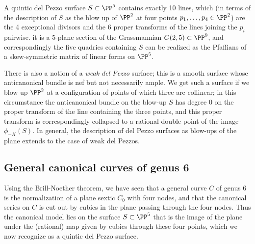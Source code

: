 \begin{fact}
A quintic del Pezzo surface $S \subset \PP^5$ contains exactly 10 lines, which (in terms of the description of $S$ as the blow up of $\PP^2$ at four points $p_1,\dots,p_4 \in \PP^2$) are the 4 exceptional divisors and the 6 proper transforms of the lines joining the $p_i$ pairwise. 
 it is a 5-plane section of the Grassmannian $G(2,5) \subset \PP^9$, and correspondingly the five quadrics containing $S$ can be realized as the Pfaffians of a  skew-symmetric matrix of linear forms on $\PP^5$. 
 



There is also a notion of a \emph{weak del Pezzo} surface; this is a smooth surface whose anticanonical bundle is nef but not necessarily ample. We get such a surface if we blow up $\PP^2$ at a configuration of points of which three are collinear; in this circumstance the anticanonical bundle on the blow-up $S$ has degree 0 on the proper transform of the line containing the three points, and this proper transform is correspondingly collapsed to a rational double point of the image $\phi_{-K}(S)$. In general, the description of del Pezzo surfaces as blow-ups of the plane extends to the case of weak del Pezzos.
\end{fact}


\subsection{General canonical curves of genus 6}

Using the Brill-Noether theorem, we have seen that a general curve $C$ of genus 6 is the normalization of a plane sextic $C_0$ with four nodes, and that the canonical series on $C$ is cut out by cubics in the plane passing through the four nodes. Thus the canonical model lies on the surface $S \subset \PP^5$ that is the image of the plane under the (rational) map given by cubics through these four points, which we now recognize as a quintic del Pezzo surface.


